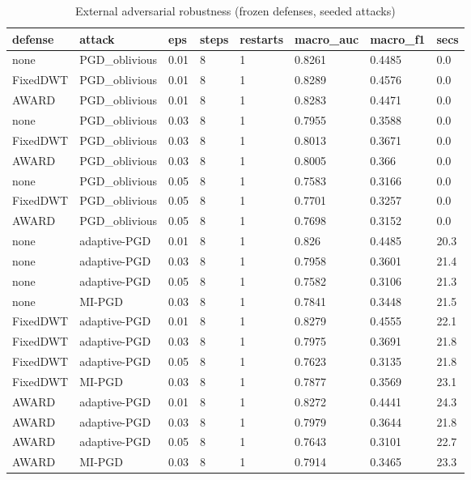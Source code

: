 \begin{table}[htbp]\centering\small
\caption{External adversarial robustness (frozen defenses, seeded attacks)}\label{tab:extrob}
\begin{tabular}{llllllll}
\hline
defense & attack & eps & steps & restarts & macro_auc & macro_f1 & secs \\
\hline
none & PGD_oblivious & 0.01 & 8 & 1 & 0.8261 & 0.4485 & 0.0 \\
FixedDWT & PGD_oblivious & 0.01 & 8 & 1 & 0.8289 & 0.4576 & 0.0 \\
AWARD & PGD_oblivious & 0.01 & 8 & 1 & 0.8283 & 0.4471 & 0.0 \\
none & PGD_oblivious & 0.03 & 8 & 1 & 0.7955 & 0.3588 & 0.0 \\
FixedDWT & PGD_oblivious & 0.03 & 8 & 1 & 0.8013 & 0.3671 & 0.0 \\
AWARD & PGD_oblivious & 0.03 & 8 & 1 & 0.8005 & 0.366 & 0.0 \\
none & PGD_oblivious & 0.05 & 8 & 1 & 0.7583 & 0.3166 & 0.0 \\
FixedDWT & PGD_oblivious & 0.05 & 8 & 1 & 0.7701 & 0.3257 & 0.0 \\
AWARD & PGD_oblivious & 0.05 & 8 & 1 & 0.7698 & 0.3152 & 0.0 \\
none & adaptive-PGD & 0.01 & 8 & 1 & 0.826 & 0.4485 & 20.3 \\
none & adaptive-PGD & 0.03 & 8 & 1 & 0.7958 & 0.3601 & 21.4 \\
none & adaptive-PGD & 0.05 & 8 & 1 & 0.7582 & 0.3106 & 21.3 \\
none & MI-PGD & 0.03 & 8 & 1 & 0.7841 & 0.3448 & 21.5 \\
FixedDWT & adaptive-PGD & 0.01 & 8 & 1 & 0.8279 & 0.4555 & 22.1 \\
FixedDWT & adaptive-PGD & 0.03 & 8 & 1 & 0.7975 & 0.3691 & 21.8 \\
FixedDWT & adaptive-PGD & 0.05 & 8 & 1 & 0.7623 & 0.3135 & 21.8 \\
FixedDWT & MI-PGD & 0.03 & 8 & 1 & 0.7877 & 0.3569 & 23.1 \\
AWARD & adaptive-PGD & 0.01 & 8 & 1 & 0.8272 & 0.4441 & 24.3 \\
AWARD & adaptive-PGD & 0.03 & 8 & 1 & 0.7979 & 0.3644 & 21.8 \\
AWARD & adaptive-PGD & 0.05 & 8 & 1 & 0.7643 & 0.3101 & 22.7 \\
AWARD & MI-PGD & 0.03 & 8 & 1 & 0.7914 & 0.3465 & 23.3 \\
\hline
\end{tabular}
\end{table}
